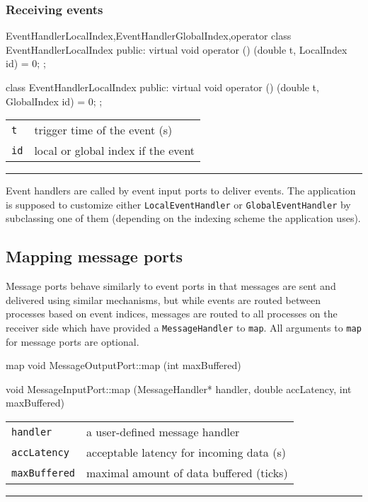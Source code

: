 \documentclass[a4paper,twoside]{report}
\makeatletter
\newenvironment{parameters}%
{\begin{tabular}{@{\hspace{2em}}lp{0.6\textwidth}}}%
{\end{tabular}\par\vspace{1mm}\par\hrule\par\vspace{5mm}}
\makeatother
\begin{document}
\subsubsection{Receiving events}

\begin{head}{EventHandlerLocalIndex,EventHandlerGlobalIndex,operator}
  class EventHandlerLocalIndex {
  public:
    virtual void operator () (double t,
                              LocalIndex id) = 0;
  };

  class EventHandlerLocalIndex {
  public:
    virtual void operator () (double t,
                              GlobalIndex id) = 0;
  };
\end{head}
\begin{parameters}
  \lstinline|t| & trigger time of the event (s) \\
  \lstinline|id| & local or global index if the event \\
\end{parameters}

Event handlers are called by event input ports to deliver events.  The
application is supposed to customize either
\lstinline|LocalEventHandler| or \lstinline|GlobalEventHandler| by
subclassing one of them (depending on the indexing
scheme the application uses).


\clearpage
\subsection{Mapping message ports}

Message ports behave similarly to event ports in that messages are
sent and delivered using similar mechanisms, but while events are
routed between processes based on event indices, messages are routed to all
processes on the receiver side which have provided a
\lstinline|MessageHandler| to \lstinline|map|.  All arguments to
\lstinline|map| for message ports are optional.

\begin{head}{map}
  void MessageOutputPort::map (int maxBuffered)

  void MessageInputPort::map (MessageHandler* handler,
                              double accLatency,
                              int maxBuffered)
\end{head}
\begin{parameters}
  \lstinline|handler| & a user-defined message handler \\
  \lstinline|accLatency| & acceptable latency for incoming data (s) \\
  \lstinline|maxBuffered| & maximal amount of data buffered (ticks) \\
\end{parameters}
\end{document}

